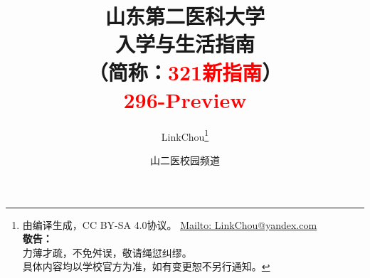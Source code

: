 

\title{%
\normalsize
{\Huge\textbf{山东第二医科大学\\[6pt]入学与生活指南}}\\[6pt]
（简称：\textcolor{red}{321新指南}）\\[25pt]
{\large\textcolor{red}{296-Preview}}\vspace*{-25pt}}
\author{LinkChou\thanks{由\LaTeXe 编译生成，CC BY-SA 4.0协议。%
                \uline{\href{Mailto:LinkChou@yandex.com}{Mailto: LinkChou@yandex.com}}\\%
                \textbf{敬告：}\\%
                \indent\indent 力薄才疏，不免舛误，敬请绳愆纠缪。\\%
                \indent\indent 具体内容均以学校官方为准，如有变更恕不另行通知。}
        \and 山二医校园频道}
\date{\DTMnow}
\maketitle

\renewcommand{\thefootnote}{\arabic{footnote}}

\tableofcontents